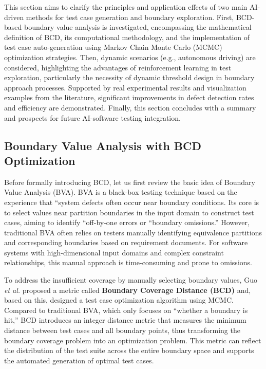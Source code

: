 \documentclass[manuscript,screen,review]{acmart}
\begin{document}
This section aims to clarify the principles and application effects of two main AI-driven methods for test case generation and boundary exploration. First, BCD-based boundary value analysis is investigated, encompassing the mathematical definition of BCD, its computational methodology, and the implementation of test case auto-generation using Markov Chain Monte Carlo (MCMC) optimization strategies. Then, dynamic scenarios (e.g., autonomous driving) are considered, highlighting the advantages of reinforcement learning in test exploration, particularly the necessity of dynamic threshold design in boundary approach processes.   Supported by real experimental results and visualization examples from the literature, significant improvements in defect detection rates and efficiency are demonstrated.   Finally, this section concludes with a summary and prospects for future AI-software testing integration.
\subsection{Boundary Value Analysis with BCD Optimization}

Before formally introducing BCD, let us first review the basic idea of Boundary Value Analysis (BVA). BVA is a black-box testing technique based on the experience that ``system defects often occur near boundary conditions. Its core is to select values near partition boundaries in the input domain to construct test cases, aiming to identify ``off-by-one errors or ``boundary omissions.'' However, traditional BVA often relies on testers manually identifying equivalence partitions and corresponding boundaries based on requirement documents. For software systems with high-dimensional input domains and complex constraint relationships, this manual approach is time-consuming and prone to omissions.

To address the insufficient coverage by manually selecting boundary values, Guo \textit{et al.}\cite{Guo2024} proposed a metric called \textbf{Boundary Coverage Distance (BCD)} and, based on this, designed a test case optimization algorithm using MCMC. Compared to traditional BVA, which only focuses on ``whether a boundary is hit,'' BCD introduces an integer distance metric that measures the minimum distance between test cases and all boundary points, thus transforming the boundary coverage problem into an optimization problem. This metric can reflect the distribution of the test suite across the entire boundary space and supports the automated generation of optimal test cases.
\end{document}
